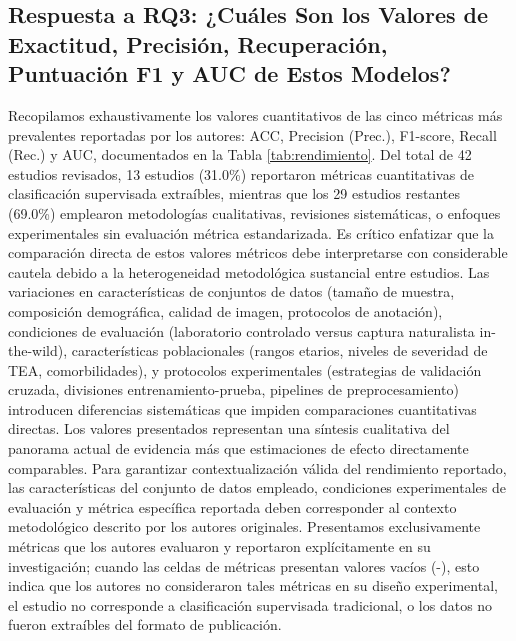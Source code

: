 \documentclass{ieeeaccess}
\begin{document}
	\subsection{Respuesta a RQ3: ¿Cuáles Son los Valores de Exactitud, Precisión, Recuperación, Puntuación F1 y AUC de Estos Modelos?}
	
	Recopilamos exhaustivamente los valores cuantitativos de las cinco métricas más prevalentes reportadas por los autores: ACC, Precision (Prec.), F1-score, Recall (Rec.) y AUC, documentados en la Tabla \ref{tab:rendimiento}. Del total de 42 estudios revisados, 13 estudios (31.0\%) reportaron métricas cuantitativas de clasificación supervisada extraíbles, mientras que los 29 estudios restantes (69.0\%) emplearon metodologías cualitativas, revisiones sistemáticas, o enfoques experimentales sin evaluación métrica estandarizada. Es crítico enfatizar que la comparación directa de estos valores métricos debe interpretarse con considerable cautela debido a la heterogeneidad metodológica sustancial entre estudios. Las variaciones en características de conjuntos de datos (tamaño de muestra, composición demográfica, calidad de imagen, protocolos de anotación), condiciones de evaluación (laboratorio controlado versus captura naturalista in-the-wild), características poblacionales (rangos etarios, niveles de severidad de TEA, comorbilidades), y protocolos experimentales (estrategias de validación cruzada, divisiones entrenamiento-prueba, pipelines de preprocesamiento) introducen diferencias sistemáticas que impiden comparaciones cuantitativas directas. Los valores presentados representan una síntesis cualitativa del panorama actual de evidencia más que estimaciones de efecto directamente comparables. Para garantizar contextualización válida del rendimiento reportado, las características del conjunto de datos empleado, condiciones experimentales de evaluación y métrica específica reportada deben corresponder al contexto metodológico descrito por los autores originales. Presentamos exclusivamente métricas que los autores evaluaron y reportaron explícitamente en su investigación; cuando las celdas de métricas presentan valores vacíos (-), esto indica que los autores no consideraron tales métricas en su diseño experimental, el estudio no corresponde a clasificación supervisada tradicional, o los datos no fueron extraíbles del formato de publicación.
	
\end{document}
